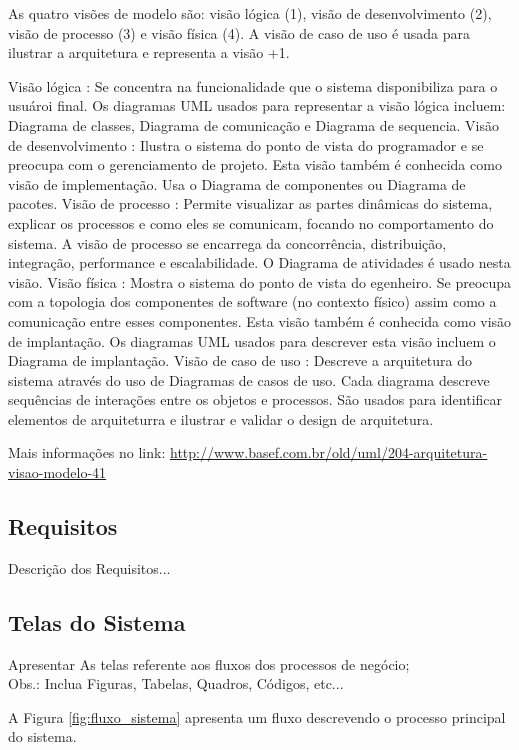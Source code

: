 \documentclass[12pt]{article}
\begin{document}
As quatro visões de modelo são: visão lógica (1), visão de desenvolvimento (2), visão de processo (3) e visão física (4). A visão de caso de uso é usada para ilustrar a arquitetura e representa a visão +1.

Visão lógica : Se concentra na funcionalidade que o sistema disponibiliza para o usuároi final. Os diagramas UML usados para representar a visão lógica incluem: Diagrama de classes, Diagrama de comunicação e Diagrama de sequencia. 
Visão de desenvolvimento : Ilustra o sistema do ponto de vista do programador e se preocupa com o gerenciamento de projeto. Esta visão também é conhecida como visão de implementação. Usa o Diagrama de componentes ou Diagrama de pacotes. 
Visão de processo : Permite visualizar as partes dinâmicas do sistema, explicar os processos e como eles se comunicam, focando no comportamento do sistema. A visão de processo se encarrega da concorrência, distribuição, integração, performance e escalabilidade. O Diagrama de atividades é usado nesta visão.
Visão física : Mostra o sistema do ponto de vista do egenheiro. Se preocupa com a topologia dos componentes de software (no contexto físico) assim como a comunicação entre esses componentes. Esta visão também é conhecida como visão de implantação. Os diagramas UML usados para descrever esta visão incluem o Diagrama de implantação.
Visão de caso de uso : Descreve a arquitetura do sistema através do uso de Diagramas de casos de uso. Cada diagrama descreve sequências de interações entre os objetos e processos. São usados para identificar elementos de arquiteturra e ilustrar e validar o design de arquitetura.

Mais informações no link: 
\url{http://www.basef.com.br/old/uml/204-arquitetura-visao-modelo-41}


\subsection{Requisitos}

Descrição dos Requisitos...


\subsection{Telas do Sistema}

Apresentar As telas referente aos fluxos dos processos de negócio;\\

Obs.: Inclua Figuras, Tabelas, Quadros, Códigos, etc...


A Figura \ref{fig:fluxo_sistema} apresenta um fluxo descrevendo o processo principal do sistema. 
\end{document}
